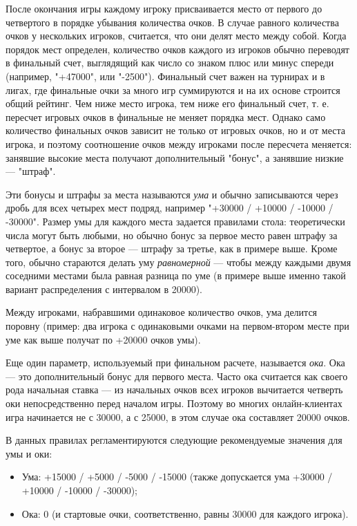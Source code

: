 После окончания игры каждому игроку присваивается место от первого до четвертого в порядке убывания количества очков. В случае равного количества очков у нескольких игроков, считается, что они делят место между собой. Когда порядок мест определен, количество очков каждого из игроков обычно переводят в финальный счет, выглядящий как число со знаком плюс или минус спереди (например, "+47000", или "-2500"). Финальный счет важен на турнирах и в лигах, где финальные очки за много игр суммируются и на их основе строится общий рейтинг. Чем ниже место игрока, тем ниже его финальный счет, т. е. пересчет игровых очков в финальные не меняет порядка мест. Однако само количество финальных очков зависит не только от игровых очков, но и от места игрока, и поэтому соотношение очков между игроками после пересчета меняется: занявшие высокие места получают дополнительный "бонус", а занявшие низкие --- "штраф".

Эти бонусы и штрафы за места называются \textit{ума} и обычно записываются через дробь для всех четырех мест подряд, например "+30000 / +10000 / -10000 / -30000". Размер умы для каждого места задается правилами стола: теоретически числа могут быть любыми, но обычно бонус за первое место равен штрафу за четвертое, а бонус за второе --- штрафу за третье, как в примере выше. Кроме того, обычно стараются делать уму \textit{равномерной} --- чтобы между каждыми двумя соседними местами была равная разница по уме (в примере выше именно такой вариант распределения с интервалом в 20000). 

Между игроками, набравшими одинаковое количество очков, ума делится поровну (пример: два игрока с одинаковыми очками на первом-втором месте при уме как выше получат по +20000 очков умы).

Еще один параметр, используемый при финальном расчете, называется \textit{ока}. Ока --- это дополнительный бонус для первого места. Часто ока считается как своего рода начальная ставка --- из начальных очков всех игроков вычитается четверть оки непосредственно перед началом игры. Поэтому во многих онлайн-клиентах игра начинается не с 30000, а с 25000, в этом случае ока составляет 20000 очков.

В данных правилах регламентируются следующие рекомендуемые значения для умы и оки:
\begin{itemize}
	\item Ума: +15000 / +5000 / -5000 / -15000 (также допускается ума +30000 / +10000 / -10000 / -30000);
	\item Ока: 0 (и стартовые очки, соответственно, равны 30000 для каждого игрока).
\end{itemize}

